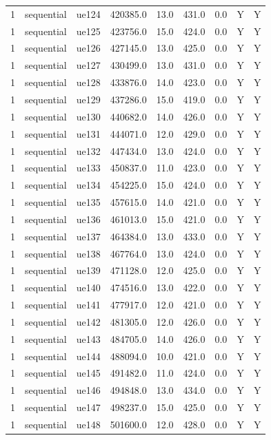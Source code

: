 \begin{table}[ht]
\begin{tabular}{|c|c|c|c|c|c|c|c|c|}
1 & sequential & ue124 & 420385.0 & 13.0 & 431.0 & 0.0 & Y & Y \\
1 & sequential & ue125 & 423756.0 & 15.0 & 424.0 & 0.0 & Y & Y \\
1 & sequential & ue126 & 427145.0 & 13.0 & 425.0 & 0.0 & Y & Y \\
1 & sequential & ue127 & 430499.0 & 13.0 & 431.0 & 0.0 & Y & Y \\
1 & sequential & ue128 & 433876.0 & 14.0 & 423.0 & 0.0 & Y & Y \\
1 & sequential & ue129 & 437286.0 & 15.0 & 419.0 & 0.0 & Y & Y \\
1 & sequential & ue130 & 440682.0 & 14.0 & 426.0 & 0.0 & Y & Y \\
1 & sequential & ue131 & 444071.0 & 12.0 & 429.0 & 0.0 & Y & Y \\
1 & sequential & ue132 & 447434.0 & 13.0 & 424.0 & 0.0 & Y & Y \\
1 & sequential & ue133 & 450837.0 & 11.0 & 423.0 & 0.0 & Y & Y \\
1 & sequential & ue134 & 454225.0 & 15.0 & 424.0 & 0.0 & Y & Y \\
1 & sequential & ue135 & 457615.0 & 14.0 & 421.0 & 0.0 & Y & Y \\
1 & sequential & ue136 & 461013.0 & 15.0 & 421.0 & 0.0 & Y & Y \\
1 & sequential & ue137 & 464384.0 & 13.0 & 433.0 & 0.0 & Y & Y \\
1 & sequential & ue138 & 467764.0 & 13.0 & 424.0 & 0.0 & Y & Y \\
1 & sequential & ue139 & 471128.0 & 12.0 & 425.0 & 0.0 & Y & Y \\
1 & sequential & ue140 & 474516.0 & 13.0 & 422.0 & 0.0 & Y & Y \\
1 & sequential & ue141 & 477917.0 & 12.0 & 421.0 & 0.0 & Y & Y \\
1 & sequential & ue142 & 481305.0 & 12.0 & 426.0 & 0.0 & Y & Y \\
1 & sequential & ue143 & 484705.0 & 14.0 & 426.0 & 0.0 & Y & Y \\
1 & sequential & ue144 & 488094.0 & 10.0 & 421.0 & 0.0 & Y & Y \\
1 & sequential & ue145 & 491482.0 & 11.0 & 424.0 & 0.0 & Y & Y \\
1 & sequential & ue146 & 494848.0 & 13.0 & 434.0 & 0.0 & Y & Y \\
1 & sequential & ue147 & 498237.0 & 15.0 & 425.0 & 0.0 & Y & Y \\
1 & sequential & ue148 & 501600.0 & 12.0 & 428.0 & 0.0 & Y & Y \\

\end{tabular}
\end{table}
